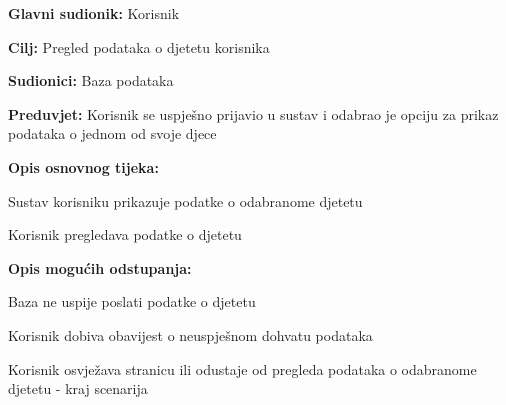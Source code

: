 					\noindent {}
					\begin{packed_item}
	
						\item \textbf{Glavni sudionik: }Korisnik
						\item  \textbf{Cilj:} Pregled podataka o djetetu korisnika
						\item  \textbf{Sudionici:} Baza podataka
						\item  \textbf{Preduvjet:} Korisnik se uspješno prijavio u sustav i odabrao je opciju za prikaz podataka o jednom od svoje djece
						\item  \textbf{Opis osnovnog tijeka:}
						
						\item[] \begin{packed_enum}
							\item Sustav korisniku prikazuje podatke o odabranome djetetu
							\item Korisnik pregledava podatke o djetetu
						\end{packed_enum}
						\item  \textbf{Opis mogućih odstupanja:}

						\item[] \begin{packed_item}
							\item[1.a] Baza ne uspije poslati podatke o djetetu
							\item[] \begin{packed_enum}
								
								\item Korisnik dobiva obavijest o neuspješnom dohvatu podataka
								\item Korisnik osvježava stranicu ili odustaje od pregleda podataka o odabranome djetetu - kraj scenarija
							
							\end{packed_enum}	
						\end{packed_item}	
					\end{packed_item}

